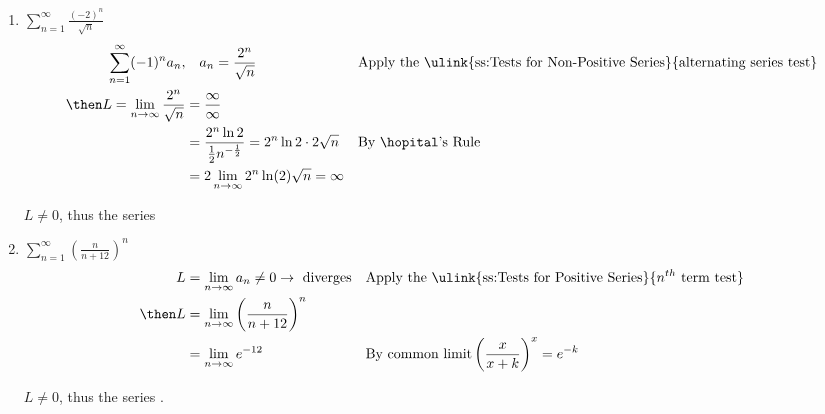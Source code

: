 \begin{enumerate}[itemsep=12em]
\vspace{-64pt}
  \item \(\displaystyle \sum_{n=1}^{\infty} \frac{(-2)^n}{\sqrt{n} } \)
    \begin{align*}
      \sum_{n=1}^{\infty} (-1)^n a_n, &\quad a_n = \frac{2^n}{\sqrt{n}}
      && \text{Apply the \ulink{ss:Tests for Non-Positive Series}{alternating series test}} \\
      \then L = \lim_{n \to \infty} \frac{2^n}{\sqrt{n} } &= \frac{\infty}{\infty} \\
      &= \frac{2^n \ln 2}{\frac{1}{2} n^{-\frac{1}{2}}} = 2^n \ln 2 \cdot 2 \sqrt{n}
      && \text{By \hopital's Rule} \\
      &= 2 \lim_{n \to \infty} 2^n \ln(2) \sqrt{n} = \infty
    \end{align*}

    \(L \neq 0\), thus the series 

  \item \(\displaystyle \sum_{n=1}^{\infty} \left( \frac{n}{n+12} \right)^n \)
    \begin{align*}
      L &= \lim_{n \to \infty} a_n \neq 0 \to ~\text{diverges}
      && \text{Apply the \ulink{ss:Tests for Positive Series}{\(n^{th} \) term test}} \\
      \then L &= \lim_{n \to \infty} \left( \frac{n}{n+12} \right)^n \\
              &= \lim_{n \to \infty} e^{-12}
      && \text{By common limit} \left( \frac{x}{x+k} \right)^x = e^{-k}  \\
    \end{align*}

    \(L \neq 0\), thus the series .

\end{enumerate}

